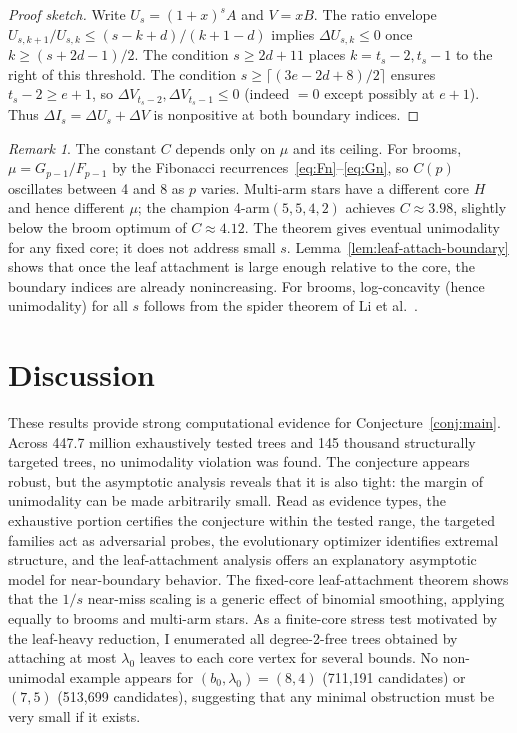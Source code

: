 \documentclass[12pt,oneside]{article}
\theoremstyle{remark}
\newtheorem{remark}{Remark}
\begin{document}
\begin{proof}[Proof sketch]
Write $U_s=(1+x)^sA$ and $V=xB$. The ratio envelope
$U_{s,k+1}/U_{s,k} \le (s-k+d)/(k+1-d)$ implies $\Delta U_{s,k}\le 0$ once
$k\ge (s+2d-1)/2$.
The condition $s\ge 2d+11$ places $k=t_s-2,t_s-1$ to the right of this threshold.
The condition $s\ge \lceil(3e-2d+8)/2\rceil$ ensures $t_s-2\ge e+1$, so
$\Delta V_{t_s-2},\Delta V_{t_s-1}\le 0$ (indeed $=0$ except possibly at $e+1$).
Thus $\Delta I_s=\Delta U_s+\Delta V$ is nonpositive at both boundary indices.
\end{proof}

\begin{remark}
  The constant $C$ depends only on $\mu$ and its ceiling. For brooms,
  $\mu = G_{p-1}/F_{p-1}$ by the Fibonacci recurrences~\eqref{eq:Fn}--\eqref{eq:Gn},
  so $C(p)$ oscillates between 4 and 8 as $p$ varies.
  Multi-arm stars have a different core $H$ and hence different $\mu$; the champion 4-arm$(5,5,4,2)$
  achieves $C \approx 3.98$, slightly below the broom optimum of $C \approx 4.12$.
  The theorem gives eventual unimodality for any fixed core; it does not
  address small $s$. Lemma~\ref{lem:leaf-attach-boundary} shows that once the
  leaf attachment is large enough relative to the core, the boundary indices are
  already nonincreasing. For brooms, log-concavity (hence unimodality) for all
  $s$ follows from the spider theorem of Li et al.\ \citep{li2025spiders}.
\end{remark}


\section{Discussion}\label{sec:discussion}

These results provide strong computational evidence for Conjecture~\ref{conj:main}.
Across 447.7 million exhaustively tested trees and 145 thousand structurally targeted trees, no unimodality violation was found.
The conjecture appears robust, but the asymptotic analysis reveals that it is also tight: the margin of unimodality can be made arbitrarily small.
Read as evidence types, the exhaustive portion certifies the conjecture within the tested range, the targeted families act as adversarial probes, the evolutionary optimizer identifies extremal structure, and the leaf-attachment analysis offers an explanatory asymptotic model for near-boundary behavior.
The fixed-core leaf-attachment theorem shows that the $1/s$ near-miss scaling is a generic effect of binomial smoothing, applying equally to brooms and multi-arm stars.
As a finite-core stress test motivated by the leaf-heavy reduction, I enumerated all degree-2-free trees obtained by attaching at most $\lambda_0$ leaves to each core vertex for several bounds.
No non-unimodal example appears for $(b_0,\lambda_0)=(8,4)$ (711{,}191 candidates) or $(7,5)$ (513{,}699 candidates), suggesting that any minimal obstruction must be very small if it exists.
\end{document}
